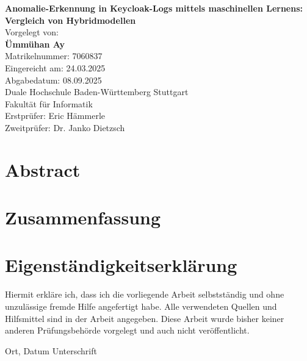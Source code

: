\documentclass[a4paper,12pt]{article}
\begin{document}
	\thispagestyle{empty}
	
	\begin{center}
		\vspace*{2cm}

		\Huge\textbf{Anomalie-Erkennung in Keycloak-Logs mittels maschinellen Lernens: Vergleich von Hybridmodellen} \\[1.5cm]
		
		\normalsize
		Vorgelegt von: \\[0.3cm]
		\textbf{Ümmühan Ay} \\
		Matrikelnummer: 7060837 \\[1cm]
		
		Eingereicht am: 24.03.2025 \\[0.3cm]
		Abgabedatum: 08.09.2025 \\[1cm]
		
		Duale Hochschule Baden-Württemberg Stuttgart\\
		Fakultät für Informatik \\[2cm]
		
		Erstprüfer: Eric Hämmerle \\
		Zweitprüfer: Dr. Janko Dietzsch
		
	\end{center}
	
	\newpage
	\section*{Abstract}
	
	\newpage
	\section*{Zusammenfassung}
	
	\newpage
	\section*{Eigenständigkeitserklärung}
	
	Hiermit erkläre ich, dass ich die vorliegende Arbeit selbstständig und ohne unzulässige fremde Hilfe angefertigt habe.  
	Alle verwendeten Quellen und Hilfsmittel sind in der Arbeit angegeben.  
	Diese Arbeit wurde bisher keiner anderen Prüfungsbehörde vorgelegt und auch nicht veröffentlicht.
	
	\vspace{2cm}
	
	\noindent Ort, Datum \hfill Unterschrift
	\newpage
	\tableofcontents
	\newpage
	\listoffigures
	\newpage
	\listoftables
	\newpage
\end{document}
